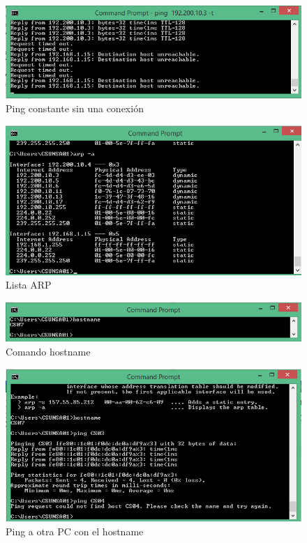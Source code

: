 \documentclass[a4paper,12pt]{article}
\begin{document}
 \begin{figure}[H]
  \centering
  \includegraphics[scale = 0.5]{18.png}
  \caption{Ping constante sin una conexión}
 \end{figure}
 
 \begin{figure}[H]
  \centering
  \includegraphics[scale = 0.5]{19.png}
  \caption{Lista ARP}
 \end{figure}
 
 \begin{figure}[H]
  \centering
  \includegraphics[scale = 0.5]{20.png}
  \caption{Comando hostname}
 \end{figure}
 
 \begin{figure}[H]
  \centering
  \includegraphics[scale = 0.5]{21.png}
  \caption{Ping a otra PC con el hostname}
 \end{figure}
 
\end{document}
